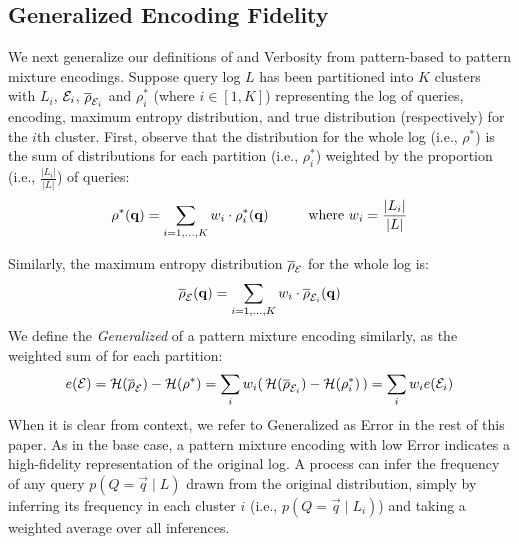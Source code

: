 \subsection{Generalized Encoding Fidelity}
\label{sec:generalizedinformationlossmeasures}
We next generalize our definitions of \errorname and Verbosity from pattern-based to pattern mixture encodings.
Suppose query log $L$ has been partitioned into $K$ clusters with $L_i$, $\mathcal E_i$, $\overline{\rho}_{\mathcal E_i}$ and $\rho^*_i$ (where $i \in [1,K]$) representing the log of queries, encoding, maximum entropy distribution, and true distribution (respectively) for the $i$th cluster. 
First, observe that the distribution for the whole log (i.e., $\rho^*$) is the sum of distributions for each partition (i.e., $\rho^*_i$) weighted by the proportion (i.e., $\frac{|L_i|}{|L|}$) of queries:
$$\rho^*(\vec{q})=\mysuml_{i=1,\ldots,K}w_i \cdot \rho^*_i(\vec{q}) \hspace{10mm}\text{where } w_i=\frac{|L_i|}{|L|}$$

Similarly, the maximum entropy distribution $\overline{\rho}_\mathcal E$ for the whole log is:
$$\overline{\rho}_\mathcal E(\mathbf{q})=\operatorname*{\sum}\limits_{i=1,\ldots,K}w_i\cdot\overline{\rho}_{\mathcal E_i}(\mathbf{q})$$
We define the \textit{Generalized \errorname} of a pattern mixture encoding similarly, as the weighted sum of \errorname for each partition:
{\small
$$e(\mathcal E)=\mathcal{H}(\overline{\rho}_\mathcal E)-\mathcal{H}(\rho^*)=\operatorname*{\sum}\limits_{i}w_i(\,\mathcal{H}(\overline{\rho}_{\mathcal E_i})-\mathcal{H}(\rho^*_i)\,)=\operatorname*{\sum}\limits_{i}w_i e(\mathcal E_i)$$
}
When it is clear from context, we refer to Generalized \errorname as Error in the rest of this paper.
As in the base case, a pattern mixture encoding with low Error indicates a high-fidelity representation of the original log.
A process can infer the frequency of any query $p(Q=\vec q\;|\;L)$ drawn from the original distribution, simply by inferring its frequency in each cluster $i$ (i.e., $p(Q=\vec q\;|\;L_i)$) and taking a weighted average over all inferences. 

